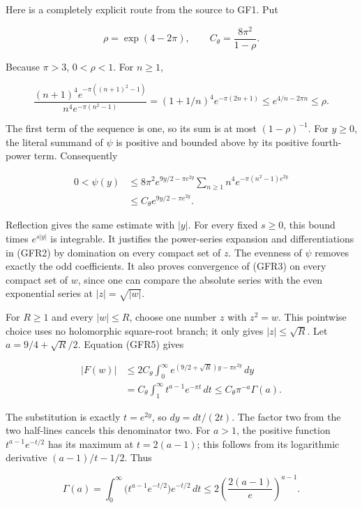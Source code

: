 Here is a completely explicit route from the source to GF1. Put

\[
\rho=\exp(4-2\pi),\qquad
C_\theta=\frac{8\pi^2}{1-\rho}.
\tag{GFR4}
\]

Because \(\pi>3\), \(0<\rho<1\). For \(n\ge1\),

\[
\frac{(n+1)^4e^{-\pi((n+1)^2-1)}}{n^4e^{-\pi(n^2-1)}}
=(1+1/n)^4e^{-\pi(2n+1)}
\le e^{4/n-2\pi n}\le\rho.
\]

The first term of the sequence is one, so its sum is at most \((1-\rho)^{-1}\). For \(y\ge0\), the literal summand of \(\psi\) is positive and bounded above by its positive fourth-power term. Consequently

\[
\begin{split}
0<\psi(y)
&\le8\pi^2e^{9y/2-\pi e^{2y}}
\sum_{n\ge1}n^4e^{-\pi(n^2-1)e^{2y}}\\
&\le C_\theta e^{9y/2-\pi e^{2y}}.
\end{split}
\tag{GFR5}
\]

Reflection gives the same estimate with \(|y|\). For every fixed \(s\ge0\), this bound times \(e^{s|y|}\) is integrable. It justifies the power-series expansion and differentiations in (GFR2) by domination on every compact set of \(z\). The evenness of \(\psi\) removes exactly the odd coefficients. It also proves convergence of (GFR3) on every compact set of \(w\), since one can compare the absolute series with the even exponential series at \(|z|=\sqrt{|w|}\).

For \(R\ge1\) and every \(|w|\le R\), choose one number \(z\) with \(z^2=w\). This pointwise choice uses no holomorphic square-root branch; it only gives \(|z|\le\sqrt R\). Let \(a=9/4+\sqrt R/2\). Equation (GFR5) gives

\[
\begin{split}
|F(w)|
&\le2C_\theta\int_0^\infty
 e^{(9/2+\sqrt R)y-\pi e^{2y}}\,dy\\
&=C_\theta\int_1^\infty t^{a-1}e^{-\pi t}\,dt
\le C_\theta\pi^{-a}\Gamma(a).
\end{split}
\tag{GFR6}
\]

The substitution is exactly \(t=e^{2y}\), so \(dy=dt/(2t)\). The factor two from the two half-lines cancels this denominator two. For \(a>1\), the positive function \(t^{a-1}e^{-t/2}\) has its maximum at \(t=2(a-1)\); this follows from its logarithmic derivative \((a-1)/t-1/2\). Thus

\[
\Gamma(a)=\int_0^\infty
 \bigl(t^{a-1}e^{-t/2}\bigr)e^{-t/2}\,dt
\le2\left(\frac{2(a-1)}e\right)^{a-1}.
\tag{GFR7}
\]

